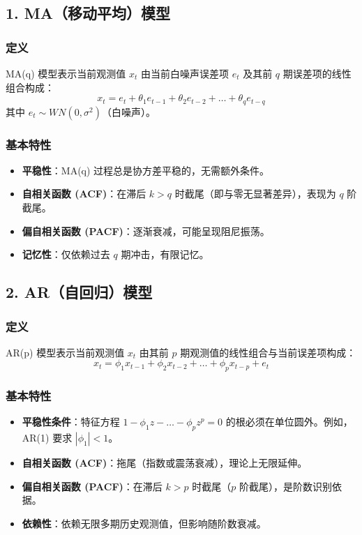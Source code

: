 \subsection*{1. MA（移动平均）模型}

\subsubsection*{定义}
MA(q) 模型表示当前观测值 \(x_t\) 由当前白噪声误差项 \(e_t\) 及其前 \(q\) 期误差项的线性组合构成：
\[
x_t = e_t + \theta_1 e_{t-1} + \theta_2 e_{t-2} + \dots + \theta_q e_{t-q}
\]
其中 \(e_t \sim WN(0, \sigma^2)\)（白噪声）。

\subsubsection*{基本特性}
\begin{itemize}
    \item \textbf{平稳性}：MA(q) 过程总是协方差平稳的，无需额外条件。
    \item \textbf{自相关函数 (ACF)}：在滞后 \(k > q\) 时截尾（即与零无显著差异），表现为 \(q\) 阶截尾。
    \item \textbf{偏自相关函数 (PACF)}：逐渐衰减，可能呈现阻尼振荡。
    \item \textbf{记忆性}：仅依赖过去 \(q\) 期冲击，有限记忆。
\end{itemize}

\subsection*{2. AR（自回归）模型}

\subsubsection*{定义}
AR(p) 模型表示当前观测值 \(x_t\) 由其前 \(p\) 期观测值的线性组合与当前误差项构成：
\[
x_t = \phi_1 x_{t-1} + \phi_2 x_{t-2} + \dots + \phi_p x_{t-p} + e_t
\]

\subsubsection*{基本特性}
\begin{itemize}
    \item \textbf{平稳性条件}：特征方程 \(1 - \phi_1 z - \dots - \phi_p z^p = 0\) 的根必须在单位圆外。例如，AR(1) 要求 \(|\phi_1| < 1\)。
    \item \textbf{自相关函数 (ACF)}：拖尾（指数或震荡衰减），理论上无限延伸。
    \item \textbf{偏自相关函数 (PACF)}：在滞后 \(k > p\) 时截尾（\(p\) 阶截尾），是阶数识别依据。
    \item \textbf{依赖性}：依赖无限多期历史观测值，但影响随阶数衰减。
\end{itemize}

